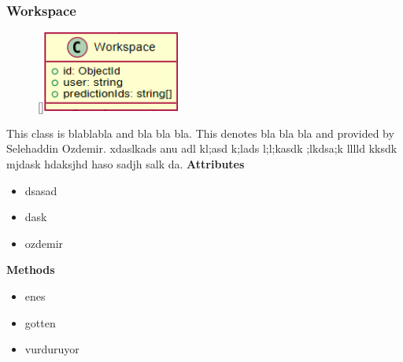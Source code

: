 \subsubsection{Workspace}
\begin{figure}
    \raisebox{0pt}[\dimexpr{}\baselineskip\relax]{\includegraphics[width=4.5cm]{classes/model-management/2.png}}
\end{figure} 
\par
This class is blablabla and bla bla bla. This denotes bla bla bla and provided by Selehaddin Ozdemir. xdaslkads anu adl kl;asd k;lads l;l;kasdk ;lkdsa;k lllld kksdk mjdask hdaksjhd haso sadjh salk da.
\newline
\newline
\textbf{Attributes}
\begin{itemize}
    \item dsasad
    \item dask
    \item ozdemir
\end{itemize}
\textbf{Methods}
\begin{itemize}
    \item enes
    \item gotten
    \item vurduruyor
\end{itemize}

